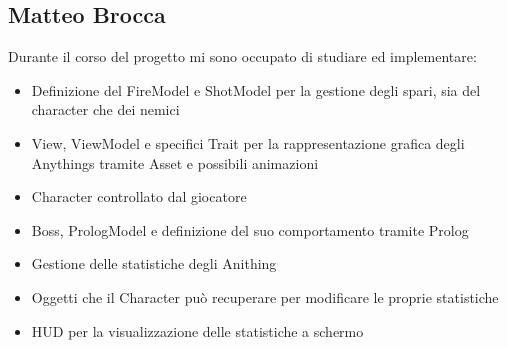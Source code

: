 \subsection{Matteo Brocca}
Durante il corso del progetto mi sono occupato di studiare ed implementare:
\begin{itemize}
    \item Definizione del FireModel e ShotModel per la gestione degli spari, sia del character che dei nemici
    \item View, ViewModel e specifici Trait per la rappresentazione grafica degli Anythings tramite Asset e possibili animazioni
    \item Character controllato dal giocatore
    \item Boss, PrologModel e definizione del suo comportamento tramite Prolog
    \item Gestione delle statistiche degli Anithing 
    \item Oggetti che il Character può recuperare per modificare le proprie statistiche
    \item HUD per la visualizzazione delle statistiche a schermo
\end{itemize}


